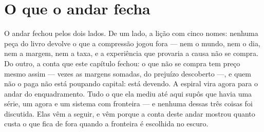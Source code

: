 \section{O que o andar fecha}

O andar fechou pelos dois lados. De um lado, a lição com cinco nomes: nenhuma peça do livro devolve
o que a compressão jogou fora --- nem o mundo, nem o dia, nem a margem, nem a taxa, e a experiência
que provaria a causa não se compra. Do outro, a conta que este capítulo fechou: o que não se compra
tem preço mesmo assim --- \numPrecoRazao{} vezes as margens somadas, \numPrecoDescobertoMarginal{} do
prejuízo descoberto ---, e quem não o paga não está poupando capital: está devendo. A espiral vira
agora para o andar do enquadramento. Tudo o que ela mediu até aqui supôs que havia uma série, um
agora e um sistema com fronteira --- e nenhuma dessas três coisas foi discutida. Elas vêm a seguir, e
vêm porque a conta deste andar mostrou quanto custa o que fica de fora quando a fronteira é
escolhida no escuro.